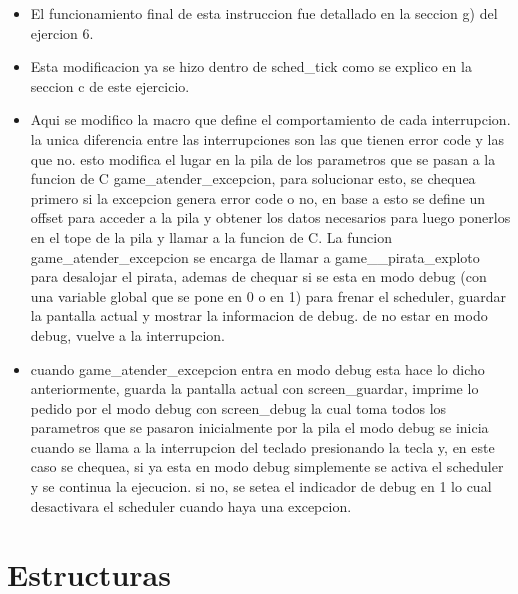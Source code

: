 \begin{itemize}
\item El funcionamiento final de esta instruccion fue detallado en la seccion g) del ejercion 6.

\item Esta modificacion ya se hizo dentro de sched_tick como se explico en la seccion c de este ejercicio.

\item Aqui se modifico la macro que define el comportamiento de cada interrupcion. la unica diferencia entre las interrupciones
  son las que tienen error code y las que no. esto modifica el lugar en la pila de los parametros que se pasan a la funcion de C
  game_atender_excepcion, para solucionar esto, se chequea primero si la excepcion genera error code o no, en base a esto se define un
  offset para acceder a la pila y obtener los datos necesarios para luego ponerlos en el tope de la pila y llamar a la funcion de C.
  La funcion game_atender_excepcion se encarga de llamar a game__pirata_exploto para desalojar el pirata, ademas de chequar
  si se esta en modo debug (con una variable global que se pone en 0 o en 1) para frenar el scheduler, guardar la pantalla actual y mostrar la informacion de debug. de no estar
  en modo debug, vuelve a la interrupcion.

\item cuando game_atender_excepcion entra en modo debug esta hace lo dicho anteriormente, guarda la pantalla actual con screen_guardar,
  imprime lo pedido por el modo debug con screen_debug la cual toma todos los parametros que se pasaron inicialmente por la pila
  el modo debug se inicia cuando se llama a la interrupcion del teclado presionando la tecla y, en este caso se chequea, si ya esta en modo
  debug simplemente se activa el scheduler y se continua la ejecucion. si no, se setea el indicador de debug en 1 lo cual desactivara
  el scheduler cuando haya una excepcion.
\end{itemize}

\section{Estructuras}


